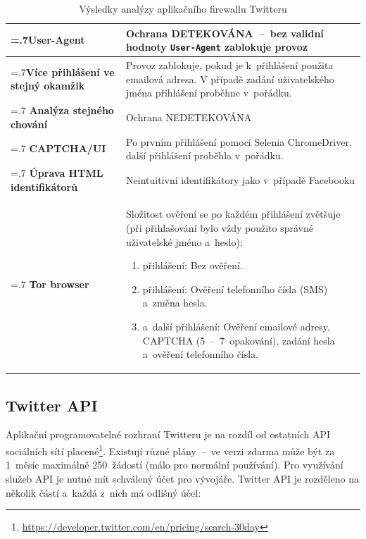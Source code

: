 \begin{table}[H]
\begin{tabularx}{\linewidth}{
    |>{\hsize=.7\hsize}X|>{\hsize=1.3\hsize}X|
  }
\hline

\textbf{User-Agent} & Ochrana DETEKOVÁNA~--~bez validní hodnoty \texttt{User-Agent} zablokuje provoz \\
\hline
\textbf{Více přihlášení ve stejný okamžik} & Provoz zablokuje, pokud je k~přihlášení použita emailová adresa. V případě zadání uživatelského jména přihlášení proběhne v~pořádku. \\
\hline
\textbf{Analýza stejného chování} & Ochrana NEDETEKOVÁNA \\
\hline
\textbf{CAPTCHA/UI} & Po prvním přihlášení pomocí Selenia ChromeDriver, další přihlášení proběhla v~pořádku. \\
\hline
\textbf{Úprava HTML identifikátorů} & Neintuitivní identifikátory jako v~případě Facebooku\\
\hline
\textbf{Tor browser} & Složitost ověření se po každém přihlášení zvětšuje (při přihlašování bylo vždy použito správné uživatelské jméno a~heslo):
    \begin{enumerate}
      \item přihlášení: Bez ověření.
      \item přihlášení: Ověření telefonního čísla (SMS) a~změna hesla.
      \item a~další přihlášení: Ověření emailové adresy, CAPTCHA (5~--~7~opakování), zadání hesla a~ověření telefonního čísla.
    \end{enumerate}
\\ \hline
\end{tabularx}
\label{tab:Twitter_analyse}
\caption{Výsledky analýzy aplikačního firewallu Twitteru}
\end{table}

\subsection*{Twitter API}
Aplikační programovatelné rozhraní Twitteru je na rozdíl od ostatních API sociálních sítí placené\footnote{\href{https://developer.twitter.com/en/pricing/search-30day}{https://developer.twitter.com/en/pricing/search-30day}}. Existují různé plány~--~ve verzi zdarma může být za 1~měsíc maximálně 250~žádostí (málo pro normální používání). Pro využívání služeb API je nutné mít schválený účet pro vývojáře. Twitter API je rozděleno na několik částí a~každá z~nich má odlišný účel:

